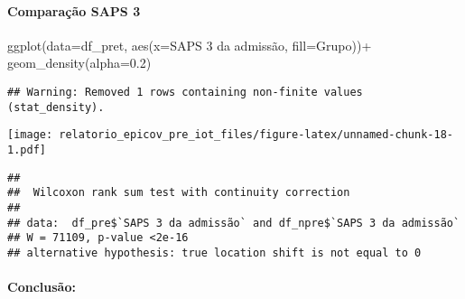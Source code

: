 \documentclass[
]{article}
\newenvironment{Shaded}{\begin{snugshade}}{\end{snugshade}}
\newcommand{\AttributeTok}[1]{\textcolor[rgb]{0.77,0.63,0.00}{#1}}
\newcommand{\FloatTok}[1]{\textcolor[rgb]{0.00,0.00,0.81}{#1}}
\newcommand{\FunctionTok}[1]{\textcolor[rgb]{0.00,0.00,0.00}{#1}}
\newcommand{\NormalTok}[1]{#1}
\newcommand{\SpecialCharTok}[1]{\textcolor[rgb]{0.00,0.00,0.00}{#1}}
\newcommand{\StringTok}[1]{\textcolor[rgb]{0.31,0.60,0.02}{#1}}
\begin{document}
\hypertarget{comparauxe7uxe3o-saps-3}{%
\paragraph{\texorpdfstring{\textbf{Comparação SAPS
3}}{Comparação SAPS 3}}\label{comparauxe7uxe3o-saps-3}}

\begin{Shaded}
\begin{Highlighting}[]
\FunctionTok{ggplot}\NormalTok{(}\AttributeTok{data=}\NormalTok{df\_pret, }\FunctionTok{aes}\NormalTok{(}\AttributeTok{x=}\StringTok{\textasciigrave{}}\AttributeTok{SAPS 3 da admissão}\StringTok{\textasciigrave{}}\NormalTok{, }\AttributeTok{fill=}\NormalTok{Grupo))}\SpecialCharTok{+}
  \FunctionTok{geom\_density}\NormalTok{(}\AttributeTok{alpha=}\FloatTok{0.2}\NormalTok{)}
\end{Highlighting}
\end{Shaded}

\begin{verbatim}
## Warning: Removed 1 rows containing non-finite values (stat_density).
\end{verbatim}

\texttt{[image: relatorio\_epicov\_pre\_iot\_files/figure-latex/unnamed-chunk-18-1.pdf]}

\begin{Shaded}
\end{Shaded}

\begin{verbatim}
## 
##  Wilcoxon rank sum test with continuity correction
## 
## data:  df_pre$`SAPS 3 da admissão` and df_npre$`SAPS 3 da admissão`
## W = 71109, p-value <2e-16
## alternative hypothesis: true location shift is not equal to 0
\end{verbatim}

\hypertarget{conclusuxe3o}{%
\paragraph{\texorpdfstring{\textbf{Conclusão:}}{Conclusão:}}\label{conclusuxe3o}}
\end{document}

